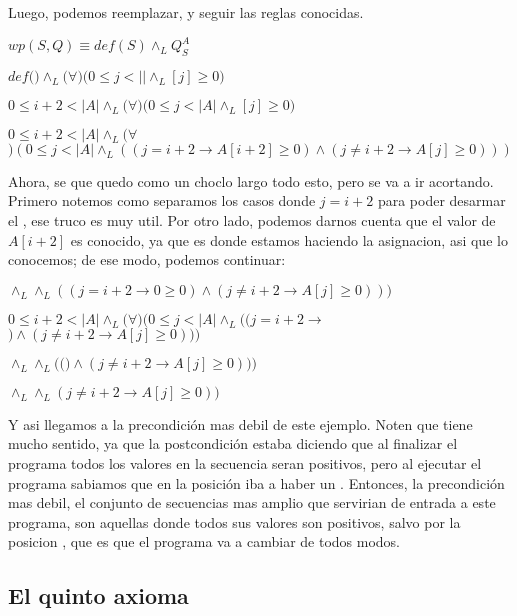 \documentclass{article}
\begin{document}
Luego, podemos reemplazar, y seguir las reglas conocidas.

$wp(S, Q) \equiv def(S) \land_{L} Q_{S}^{A}$

$def($$) \land_{L} (\forall$$)(0 \leq j < |$$| \land_{L}$$[j] \geq 0)$

$0 \leq i+2 < |A| \land_{L} (\forall$$)(0 \leq j < |A| \land_{L}$$[j] \geq 0)$

$0 \leq i+2 < |A| \land_{L} (\forall$$)(0 \leq j < |A| \land_{L}((j = i + 2 \longrightarrow A[i+2] \geq 0) \land (j \neq i + 2 \longrightarrow A[j] \geq 0)))$

Ahora, se que quedo como un choclo largo todo esto, pero se va a ir acortando. Primero notemos como separamos los casos donde $j = i + 2$ para poder desarmar el \setAt{}{}{}, ese truco es muy util. Por otro lado, podemos darnos cuenta que el valor de $A[i+2]$ es conocido, ya que es donde estamos haciendo la asignacion, asi que lo conocemos; de ese modo, podemos continuar:

$\land_{L}$$\land_{L}((j = i + 2 \longrightarrow 0 \geq 0) \land (j \neq i + 2 \longrightarrow A[j] \geq 0)))$

$0 \leq i+2 < |A| \land_{L} (\forall$$)(0 \leq j < |A| \land_{L}((j = i + 2 \longrightarrow$\True$) \land (j \neq i + 2 \longrightarrow A[j] \geq 0)))$

$\land_{L}$$\land_{L}(($\True$) \land (j \neq i + 2 \longrightarrow A[j] \geq 0)))$

$\land_{L}$$\land_{L}(j \neq i + 2 \longrightarrow A[j] \geq 0))$

Y asi llegamos a la precondición mas debil de este ejemplo. Noten que tiene mucho sentido, ya que la postcondición estaba diciendo que al finalizar el programa todos los valores en la secuencia  seran positivos, pero al ejecutar el programa sabiamos que en la posición  iba a haber un . Entonces, la precondición mas debil, el conjunto de secuencias mas amplio que servirian de entrada a este programa, son aquellas donde todos sus valores son positivos, salvo por la posicion , que es que el programa va a cambiar de todos modos.

\subsection{El quinto axioma}
\end{document}
